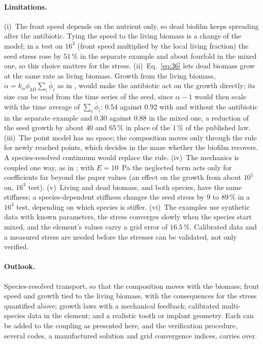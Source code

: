 \documentclass[11pt,a4paper]{article}
\newcommand{\phiD}{\phi_{3D}}
\newcommand{\lv}{\textstyle\sum_i\bar\phi_i}
\begin{document}
\paragraph{Limitations.} (i)~The front speed depends on the nutrient only, so dead biofilm keeps spreading after the antibiotic. Tying the speed to the living biomass is a change of the model; in a test on $16^3$ (front speed multiplied by the local living fraction) the seed stress rose by $51\,\%$ in the separate example and about fourfold in the mixed one, so this choice matters for the stress. (ii)~Eq.~\eqref{eq:36} lets dead biomass grow at the same rate as living biomass. Growth from the living biomass, $\dot\alpha=k_\alpha\phiD\lv$ as in \citet{WannerGujer1986}, would make the antibiotic act on the growth directly; its size can be read from the time series of the seed, since $\alpha-1$ would then scale with the time average of $\lv$: $0.54$ against $0.92$ with and without the antibiotic in the separate example and $0.30$ against $0.88$ in the mixed one, a reduction of the seed growth by about $40$ and $65\,\%$ in place of the $1\,\%$ of the published law. (iii)~The point model has no space; the composition moves only through the rule for newly reached points, which decides in the maze whether the biofilm recovers. A species-resolved continuum would replace the rule. (iv)~The mechanics is coupled one way, as in \citet{Klempt2024DiffusionDrivenGrowth}; with $E=10$~Pa the neglected term acts only for coefficients far beyond the paper values (an effect on the growth from about $10^5$ on, $16^3$ test). (v)~Living and dead biomass, and both species, have the same stiffness; a species-dependent stiffness changes the seed stress by $9$ to $89\,\%$ in a $16^3$ test, depending on which species is stiffer. (vi)~The examples use synthetic data with known parameters, the stress converges slowly when the species start mixed, and the element's values carry a grid error of $16.5\,\%$. Calibrated data \citep[for example the five-species data of][]{Heine2025PeriImplant} and a measured stress are needed before the stresses can be validated, not only verified.

\paragraph{Outlook.} Species-resolved transport, so that the composition moves with the biomass; front speed and growth tied to the living biomass, with the consequences for the stress quantified above; growth laws with a mechanical feedback; calibrated multi-species data in the element; and a realistic tooth or implant geometry. Each can be added to the coupling as presented here, and the verification procedure, several codes, a manufactured solution and grid convergence indices, carries over.
\end{document}
